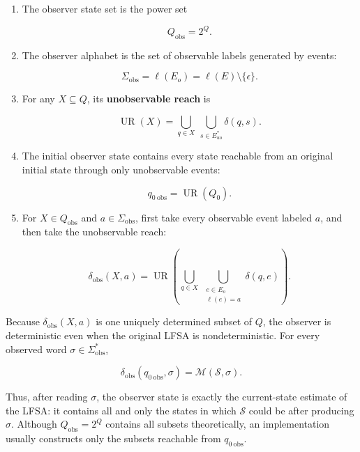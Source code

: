 \documentclass[11pt]{article}
\begin{document}
\begin{enumerate}
\item The observer state set is the power set

\[
   Q_{\mathrm{obs}}=2^Q.
\]

\item The observer alphabet is the set of observable labels generated by events:

\[
   \Sigma_{\mathrm{obs}}
   =\ell(E_o)
   =\ell(E)\setminus\{\epsilon\}.
\]

\item For any $X\subseteq Q$, its \textbf{unobservable reach} is

\[
   \operatorname{UR}(X)
   =\bigcup_{q\in X}\ \bigcup_{s\in E_{uo}^*}\delta(q,s).
\]

\item The initial observer state contains every state reachable from an original initial state through only unobservable events:

\[
   q_{0\ \mathrm{obs}}
   =\operatorname{UR}(Q_0).
\]

\item For $X\in Q_{\mathrm{obs}}$ and $a\in\Sigma_{\mathrm{obs}}$, first take every observable event labeled $a$, and then take the unobservable reach:

\[
   \delta_{\mathrm{obs}}(X,a)
   =
   \operatorname{UR}\left(
   \bigcup_{q\in X}
   \ \bigcup_{\substack{e\in E_o\\\ell(e)=a}}
   \delta(q,e)
   \right).
\]

\end{enumerate}

Because $\delta_{\mathrm{obs}}(X,a)$ is one uniquely determined subset of $Q$, the observer is deterministic even when the original LFSA is nondeterministic. For every observed word $\sigma\in\Sigma_{\mathrm{obs}}^*$,

\[
\delta_{\mathrm{obs}}(q_{0\ \mathrm{obs}},\sigma)
=\mathcal M(\mathcal S,\sigma).
\]

Thus, after reading $\sigma$, the observer state is exactly the current-state estimate of the LFSA: it contains all and only the states in which $\mathcal S$ could be after producing $\sigma$. Although $Q_{\mathrm{obs}}=2^Q$ contains all subsets theoretically, an implementation usually constructs only the subsets reachable from $q_{0\ \mathrm{obs}}$.

\end{document}
